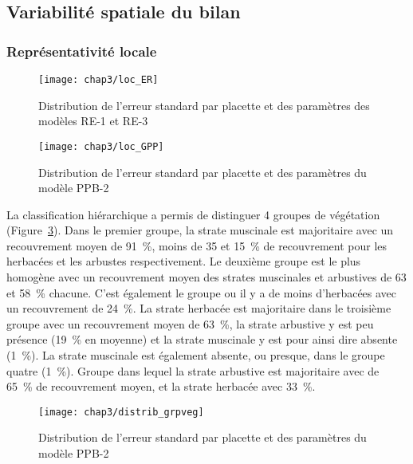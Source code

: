 \subsection{Variabilité spatiale du bilan}

\subsubsection{Représentativité locale}



\begin{figure}
\centering
\texttt{[image: chap3/loc\_ER]}
\caption{Distribution de l'erreur standard par placette et des paramètres des modèles RE-1 et RE-3}
\label{fig:loc_ER}
\end{figure}

\begin{figure}
\centering
\texttt{[image: chap3/loc\_GPP]}
\caption{Distribution de l'erreur standard par placette et des paramètres du modèle PPB-2}
\label{fig:loc_GPP}
\end{figure}

La classification hiérarchique a permis de distinguer 4 groupes de végétation (Figure~\ref{fig:distrib_grpveg}).
Dans le premier groupe, la strate muscinale est majoritaire avec un recouvrement moyen de \SI{91}{\percent}, moins de \num{35} et \SI{15}{\percent} de recouvrement pour les herbacées et les arbustes respectivement.
Le deuxième groupe est le plus homogène avec un recouvrement moyen des strates muscinales et arbustives de \num{63} et \SI{58}{\percent} chacune.
C'est également le groupe ou il y a de moins d'herbacées avec un recouvrement de \SI{24}{\percent}.
La strate herbacée est majoritaire dans le troisième groupe avec un recouvrement moyen de \SI{63}{\percent}, la strate arbustive y est peu présence (\SI{19}{\percent} en moyenne) et la strate muscinale y est pour ainsi dire absente (\SI{1}{\percent}).
La strate muscinale est également absente, ou presque, dans le groupe quatre (\SI{1}{\percent}).
Groupe dans lequel la strate arbustive est majoritaire avec de \SI{65}{\percent} de recouvrement moyen, et la strate herbacée avec \SI{33}{\percent}.

\begin{figure}
\centering
\texttt{[image: chap3/distrib\_grpveg]}
\caption{Distribution de l'erreur standard par placette et des paramètres du modèle PPB-2}
\label{fig:distrib_grpveg}
\end{figure}


